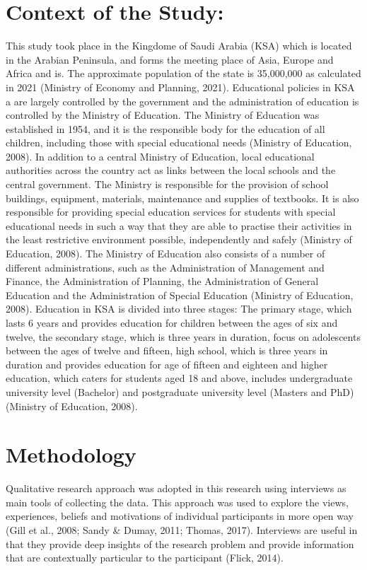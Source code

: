 \documentclass[11.5pt]{sig-alternate}
\begin{document}
\begin{large}
\section*{Context of the Study:}
This study took place in the Kingdome of Saudi Arabia (KSA) which is located in the Arabian Peninsula, and forms the meeting place of Asia, Europe and Africa and is. The approximate population of the state is 35,000,000 as calculated in 2021 (Ministry of Economy and Planning, 2021). Educational policies in KSA a are largely controlled by the government and the administration of education is controlled by the Ministry of Education. The Ministry of Education was established in 1954, and it is the responsible body for the education of all children, including those with special educational needs (Ministry of Education, 2008). In addition to a central Ministry of Education, local educational authorities across the country act as links between the local schools and the central government. The Ministry is responsible for the provision of school buildings, equipment, materials, maintenance and supplies of textbooks. It is also responsible for providing special education services for students with special educational needs in such a way that they are able to practise their activities in the least restrictive environment possible, independently and safely (Ministry of Education, 2008). The Ministry of Education also consists of a number of different administrations, such as the Administration of Management and Finance, the Administration of Planning, the Administration of General Education and the Administration of Special Education (Ministry of Education, 2008). Education in KSA is divided into three stages: The primary stage, which lasts 6 years and provides education for children between the ages of six and twelve, the secondary stage, which is three years in duration, focus on adolescents between the ages of twelve and fifteen, high school, which is three years in duration and provides education for age of fifteen and eighteen and higher education, which caters for students aged 18 and above, includes undergraduate university level (Bachelor) and postgraduate university level (Masters and PhD) (Ministry of Education, 2008).

\section*{Methodology}
Qualitative research approach was adopted in this research using interviews as main tools of collecting the data. This approach was used to explore the views, experiences, beliefs and motivations of individual participants in more open way (Gill et al., 2008; Sandy \& Dumay, 2011; Thomas, 2017). Interviews are useful in that they provide deep insights of the research problem and provide information that are contextually particular to the participant (Flick, 2014). 


\end{large}
\end{document}
